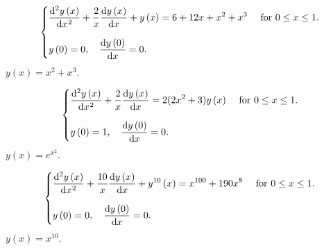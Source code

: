 \documentclass{scrartcl}
\begin{document}
	\begin{equation}
		\begin{cases}\displaystyle
			\diff[2]{y\left(x\right)}{x}+
			\frac{2}{x}
			\diff{y\left(x\right)}{x}+
			y\left(x\right)=
			6 + 12 x+ x^{2} + x^{3}
			& \text { for }0 \leq x \leq 1. \\[0.5cm]
			\displaystyle
			y
			\left(0\right)=
			0,\quad
			\diff{y\left(0\right)}{x}=
			0.
			&
		\end{cases}
	\end{equation}
	$y\left(x\right) = x^{2} + x^{3}$.
	
	\newpage
	\begin{equation}
		\begin{cases}\displaystyle
			\diff[2]{y\left(x\right)}{x}+
			\frac{2}{x}
			\diff{y\left(x\right)}{x} =
			2 (2x^{2} + 3 )y\left(x\right)
			& \text { for }0 \leq x \leq 1. \\[0.5cm]
			\displaystyle
			y
			\left(0\right)=
			1,\quad
			\diff{y\left(0\right)}{x}=
			0.
			&
		\end{cases}
	\end{equation}
	$y\left(x\right) = e^{x^{2}}$.
	
	\newpage
	\begin{equation}
		\begin{cases}\displaystyle
			\diff[2]{y\left(x\right)}{x}+
			\frac{10}{x}
			\diff{y\left(x\right)}{x} + 
			y^{10}\left(x\right) =
			x^{100} + 190x^{8}
			& \text { for }0 \leq x \leq 1. \\[0.5cm]
			\displaystyle
			y
			\left(0\right)=
			0,\quad
			\diff{y\left(0\right)}{x}=
			0.
			&
		\end{cases}
	\end{equation}
	$y\left(x\right) = x^{10}$.
	
\end{document}
